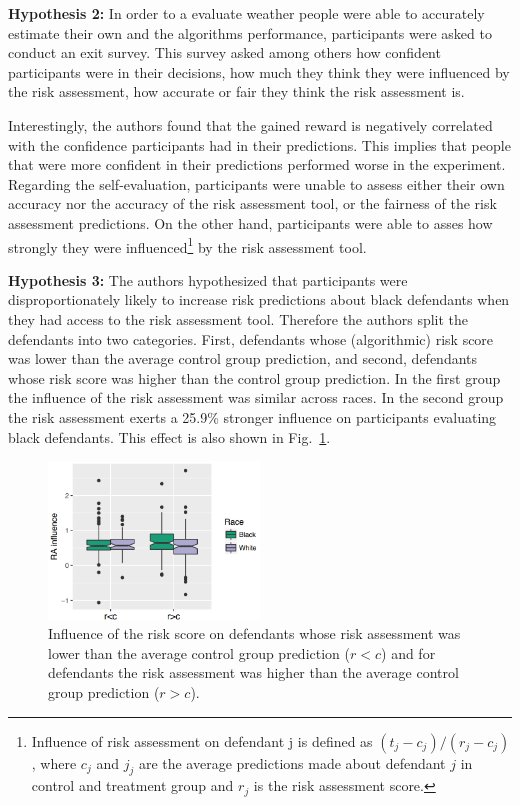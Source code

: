 \documentclass[11pt,a4paper,final]{article}
\begin{document}
\textbf{Hypothesis 2: } In order to a evaluate weather people were able to accurately estimate their own and the algorithms performance, participants were asked to conduct an exit survey. This survey asked among others how confident participants were in their decisions, how much they think they were influenced by the risk assessment, how accurate or fair they think the risk assessment is.

Interestingly, the authors found that the gained reward is negatively correlated with the confidence participants had in their predictions. This implies that people that were more confident in their predictions performed worse in the experiment. Regarding the self-evaluation, participants were unable to assess either their own accuracy nor the accuracy of the risk assessment tool, or the fairness of the risk assessment predictions. On the other hand, participants were able to asses how strongly they were influenced\footnote{Influence of risk assessment on defendant j is defined as $(t_j-c_j)/(r_j - c_j)$, where $c_j$ and $j_j$ are the average predictions made about defendant $j$ in control and treatment group and $r_j$ is the risk assessment score.} by the risk assessment tool. 

\textbf{Hypothesis 3: } The authors hypothesized that participants were disproportionately likely to increase risk predictions about black defendants when they had access to the risk assessment tool. Therefore the authors split the defendants into two categories. First, defendants whose (algorithmic) risk score was lower than the average control group prediction, and second, defendants whose risk score was higher than the control group prediction. In the first group the influence of the risk assessment was similar across races. In the second group the risk assessment exerts a 25.9\% stronger influence on participants evaluating black defendants. This effect is also shown in Fig.~\ref{fig:influence risk score}.

\begin{figure}[h]
	\centering
	\includegraphics[width=0.5\textwidth]{Figures/influence_of_risk_score.png}
	\caption{Influence of the risk score on defendants whose risk assessment was lower than the average control group prediction ($r<c$) and for defendants the risk assessment was higher than the average control group prediction ($r>c$).}
    \label{fig:influence risk score}
\end{figure}
\end{document}
